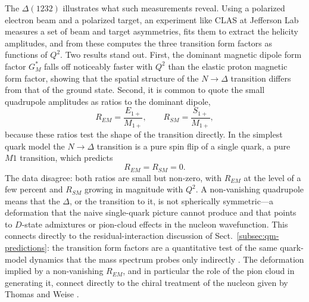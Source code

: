 The $\Delta(1232)$ illustrates what such measurements reveal. Using a polarized electron
beam and a polarized target, an experiment like CLAS at Jefferson Lab measures a set of
beam and target asymmetries, fits them to extract the helicity amplitudes, and from
these computes the three transition form factors as functions of $Q^{2}$. Two results
stand out. First, the dominant magnetic dipole form factor $G_{M}^{*}$ falls off
noticeably faster with $Q^{2}$ than the elastic proton magnetic form factor, showing
that the spatial structure of the $N\to\Delta$ transition differs from that of the
ground state. Second, it is common to quote the small quadrupole amplitudes as ratios to
the dominant dipole,
\begin{equation}
    R_{EM} = \frac{E_{1+}}{M_{1+}}, \qquad R_{SM} = \frac{S_{1+}}{M_{1+}},
    \label{eq:multipole-ratios}
\end{equation}
because these ratios test the shape of the transition directly. In the simplest quark
model the $N\to\Delta$ transition is a pure spin flip of a single quark, a pure $M1$
transition, which predicts
\begin{equation}
    R_{EM} = R_{SM} = 0.
    \label{eq:naive-quark-prediction}
\end{equation}
The data disagree: both ratios are small but non-zero, with $R_{EM}$ at the level of a
few percent and $R_{SM}$ growing in magnitude with $Q^{2}$. A non-vanishing quadrupole
means that the $\Delta$, or the transition to it, is not spherically symmetric---a
deformation that the naive single-quark picture cannot produce and that points to
$D$-state admixtures or pion-cloud effects in the nucleon wavefunction. This connects
directly to the residual-interaction discussion of
Sect.~\ref{subsec:qm-predictions}: the transition form factors are a quantitative test
of the same quark-model dynamics that the mass spectrum probes only indirectly
\cite[Ch.~14]{Amsler2018}. The deformation implied by a non-vanishing $R_{EM}$, and in
particular the role of the pion cloud in generating it, connect directly to the chiral
treatment of the nucleon given by Thomas and Weise
\cite[Ch.~2.3, Ch.~7.4]{ThomasWeise2001}.

